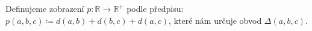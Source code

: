 \begin{definition}
    \label{definice:obvod_troj}
    Definujeme zobrazení $p: \mathbb{R}\rightarrow \mathbb{R}^+$ podle předpisu: $p(a, b, c) \coloneqq d(a, b) + d(b, c) + d(a, c)$, které nám určuje obvod $\Delta(a,b,c)$.
\end{definition}




        




